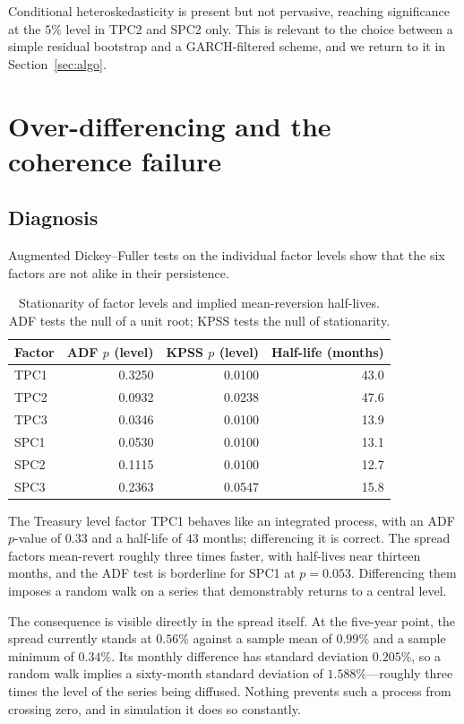\documentclass[11pt,a4paper]{article}
\begin{document}
Conditional heteroskedasticity is present but not pervasive, reaching
significance at the $5\%$ level in TPC2 and SPC2 only. This is relevant to the
choice between a simple residual bootstrap and a GARCH-filtered scheme, and we
return to it in Section~\ref{sec:algo}.

\section{Over-differencing and the coherence failure}
\label{sec:coherence}

\subsection{Diagnosis}

Augmented Dickey--Fuller tests on the individual factor levels show that the
six factors are not alike in their persistence.

\begin{table}[htbp]
\centering
\caption{Stationarity of factor levels and implied mean-reversion half-lives.
ADF tests the null of a unit root; KPSS tests the null of stationarity.}
\label{tab:adf}
\begin{tabular}{lrrr}
\toprule
Factor & ADF $p$ (level) & KPSS $p$ (level) & Half-life (months) \\
\midrule
TPC1 & 0.3250 & 0.0100 & 43.0 \\
TPC2 & 0.0932 & 0.0238 & 47.6 \\
TPC3 & 0.0346 & 0.0100 & 13.9 \\
SPC1 & 0.0530 & 0.0100 & 13.1 \\
SPC2 & 0.1115 & 0.0100 & 12.7 \\
SPC3 & 0.2363 & 0.0547 & 15.8 \\
\bottomrule
\end{tabular}
\end{table}

The Treasury level factor TPC1 behaves like an integrated process, with an ADF
$p$-value of $0.33$ and a half-life of $43$ months; differencing it is correct.
The spread factors mean-revert roughly three times faster, with half-lives near
thirteen months, and the ADF test is borderline for SPC1 at $p = 0.053$.
Differencing them imposes a random walk on a series that demonstrably returns to
a central level.

The consequence is visible directly in the spread itself. At the five-year
point, the spread currently stands at $0.56\%$ against a sample mean of $0.99\%$
and a sample minimum of $0.34\%$. Its monthly difference has standard deviation
$0.205\%$, so a random walk implies a sixty-month standard deviation of
$1.588\%$---roughly three times the level of the series being diffused. Nothing
prevents such a process from crossing zero, and in simulation it does so
constantly.
\end{document}

